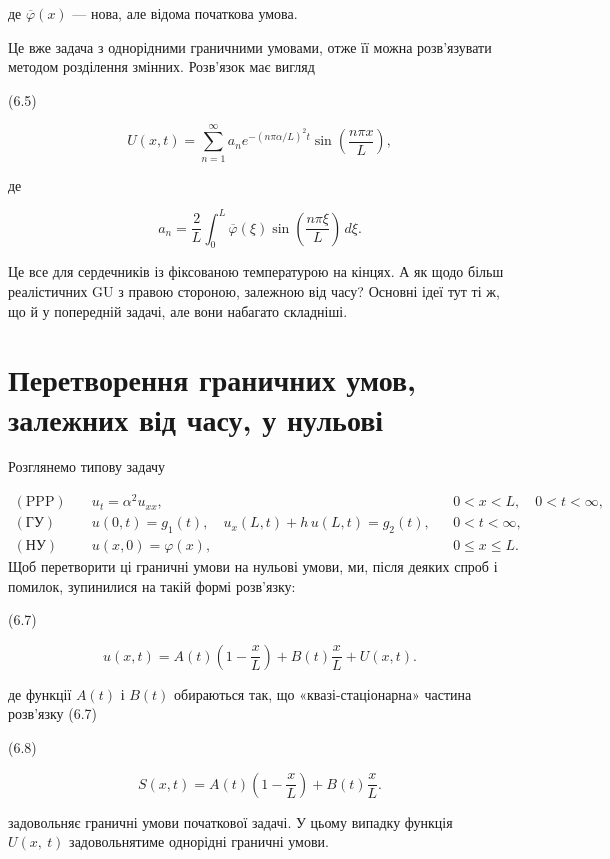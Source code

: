 \documentclass[
  ukrainian,
]{article}
\begin{document}
де \(\overline{\varphi}(x)\) --- нова, але відома початкова умова.

Це вже задача з однорідними граничними умовами, отже її можна
розв'язувати методом розділення змінних. Розв'язок має вигляд

(6.5)

\[
U(x,t)=\sum_{n=1}^{\infty} a_n e^{-(n\pi\alpha/L)^2 t}\sin\!\left(\frac{n\pi x}{L}\right),
\]

де

\[
a_n=\frac{2}{L}\int_0^L \overline{\varphi}(\xi)\sin\!\left(\frac{n\pi \xi}{L}\right)\,d\xi.
\]

Це все для сердечників із фіксованою температурою на кінцях. А як щодо
більш реалістичних GU з правою стороною, залежною від часу? Основні ідеї
тут ті ж, що й у попередній задачі, але вони набагато складніші.

\section{Перетворення граничних умов, залежних від часу, у
нульові}\label{ux43fux435ux440ux435ux442ux432ux43eux440ux435ux43dux43dux44f-ux433ux440ux430ux43dux438ux447ux43dux438ux445-ux443ux43cux43eux432-ux437ux430ux43bux435ux436ux43dux438ux445-ux432ux456ux434-ux447ux430ux441ux443-ux443-ux43dux443ux43bux44cux43eux432ux456}

Розглянемо типову задачу

\[
\begin{aligned}
(\text{PPP})\quad & u_t = \alpha^2 u_{xx}, && 0 < x < L,\quad 0 < t < \infty, \\
(\text{ГУ})\quad & u(0,t)=g_1(t),\quad u_x(L,t)+h\,u(L,t)=g_2(t), && 0 < t < \infty, \\
(\text{НУ})\quad & u(x,0)=\varphi(x), && 0 \le x \le L.
\end{aligned}
\] Щоб перетворити ці граничні умови на нульові умови, ми, після деяких
спроб і помилок, зупинилися на такій формі розв'язку:

(6.7)

\[
u(x, t)=A(t)\left(1-\frac{x}{L}\right)+B(t)\frac{x}{L}+U(x, t).
\]

де функції \(A\left(t\right)\) і \(B\left(t\right)\) обираються так, що
«квазі-стаціонарна» частина розв'язку (6.7)

(6.8)

\[
S(x, t)=A(t)\left(1-\frac{x}{L}\right)+B(t)\frac{x}{L}.
\]

задовольняє граничні умови початкової задачі. У цьому випадку функція
\(U\left(x,\ t\right)\) задовольнятиме однорідні граничні умови.
\end{document}
